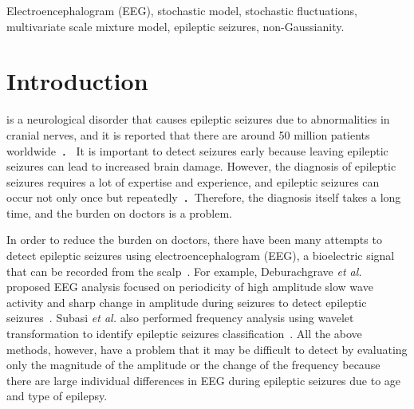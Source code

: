 \documentclass[journal]{IEEEtran}
\begin{document}
\begin{IEEEkeywords}
Electroencephalogram (EEG), stochastic model, stochastic fluctuations, multivariate scale mixture model, epileptic seizures, non-Gaussianity.
\end{IEEEkeywords}






%
\IEEEpeerreviewmaketitle



\section{Introduction}
%
%
%
%
 is a neurological disorder that causes epileptic seizures due to abnormalities in cranial nerves, and it is reported that there are around 50 million patients worldwide~\cite{WHO}．
It is important to detect seizures early because leaving epileptic seizures can lead to increased brain damage.
However, the diagnosis of epileptic seizures requires a lot of expertise and experience, and epileptic seizures can occur not only once but repeatedly~\cite{Kandel2000}．Therefore, the diagnosis itself takes a long time, and the burden on doctors is a problem.

In order to reduce the burden on doctors, there have been many attempts to detect epileptic seizures using electroencephalogram (EEG), a bioelectric signal that can be recorded from the scalp~\cite{Deburchgraeve2008,Subasi2005,kellaway1979precise,Panzica1999,fusco1993ictal,Acir2005,Greene2008}.
For example, Deburachgrave \textit{et al.} proposed EEG analysis focused on periodicity of high amplitude slow wave activity and sharp change in amplitude during seizures to detect epileptic seizures~\cite{Deburchgraeve2008}.
Subasi \textit{et al.} also performed frequency analysis using wavelet transformation to identify epileptic seizures classification~\cite{Subasi2005}.
All the above methods, however, have a problem that it may be difficult to detect by evaluating only the magnitude of the amplitude or the change of the frequency because there are large individual differences in EEG during epileptic seizures due to age and type of epilepsy.
\end{document}
